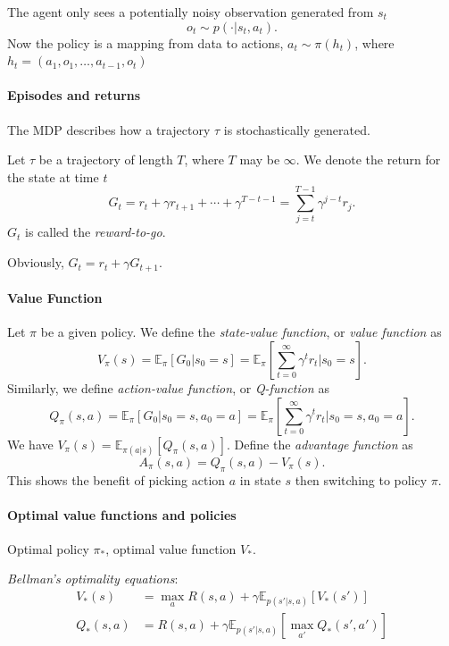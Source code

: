 \documentclass[../main.tex]{subfiles}
\begin{document}
The agent only sees a potentially noisy observation generated from $s_{t}$
\[
o_{t} \sim  p(\cdot |s_{t}, a_{t}).
\]
Now the policy is a mapping from data to actions, $a_{t} \sim  \pi(h_{t})$, where $h_{t} = (a_1,o_1, \ldots ,a_{t-1}, o_t)$


\paragraph{Episodes and returns}

The MDP describes how a trajectory $\tau$ is stochastically generated.

Let $\tau$ be a trajectory of length $T$, where $T$ may be $\infty$. We denote the return for the state at time $t$
\[
G_{t} = r_{t}  + \gamma r_{t+1} + \cdots + \gamma^{T-t-1} = \sum_{j=t}^{T-1}\gamma^{j-t}r_{j}.
\]
$G_{t}$ is called the \emph{reward-to-go}.

Obviously, $G_{t} = r_{t} + \gamma G_{t+1}$.


\paragraph{Value Function}

Let $\pi$ be a given policy. We define the \emph{state-value function}, or \emph{value function} as 
\[
V_{\pi}(s) = \mathbb{E}_{\pi}\left[ G_{0}|s_0=s \right]  = \mathbb{E}_{\pi} \left[ \sum_{t=0}^{\infty} \gamma^{t} r_{t} | s_{0} =s \right] .
\]
Similarly, we define \emph{action-value function}, or \emph{Q-function} as 
\[
Q_{\pi}(s,a) = \mathbb{E}_{\pi} \left[ G_0|s_0=s, a_0=a \right]  = \mathbb{E}_{\pi} \left[ \sum_{t=0}^{\infty}\gamma^{t} r_{t} | s_0=s, a_0=a \right] .
\]
We have $V_{\pi}(s) = \mathbb{E}_{\pi(a|s)} \left[ Q_{\pi}(s,a) \right] $.
Define the \emph{advantage function} as 
\[
A_{\pi}(s,a) = Q_{\pi}(s,a) - V_{\pi}(s).
\]
This shows the benefit of picking action $a$ in state $s$ then switching to policy $\pi$.


\paragraph{Optimal value functions and policies}

Optimal policy $\pi_{*}$, optimal value function $V_{*}$.

\emph{Bellman's optimality equations}:
\begin{equation}
\begin{aligned}
V_{*}(s) &= \max_{a} R(s,a) + \gamma \mathbb{E}_{p(s'|s,a)} \left[ V_{*}(s') \right]  \\
Q_{*}(s,a) &= R(s,a) + \gamma \mathbb{E}_{p(s'|s,a)} \left[ \max_{a'} Q_{*}(s',a')\right] 
\end{aligned}
\end{equation}
\end{document}
